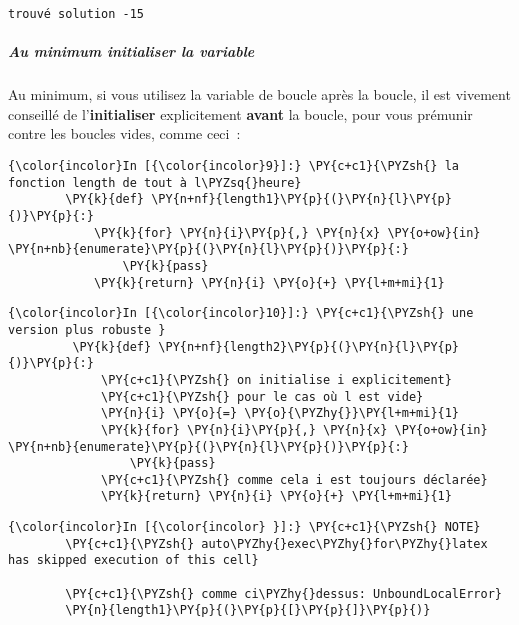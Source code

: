     \begin{Verbatim}[commandchars=\\\{\},frame=single,framerule=0.3mm,rulecolor=\color{cellframecolor}]
trouvé solution -15
\end{Verbatim}

    \hypertarget{au-minimum-initialiser-la-variable}{%
\subparagraph{Au minimum initialiser la
variable}\label{au-minimum-initialiser-la-variable}}

    Au minimum, si vous utilisez la variable de boucle après la boucle, il
est vivement conseillé de l'\textbf{initialiser} explicitement
\textbf{avant} la boucle, pour vous prémunir contre les boucles vides,
comme ceci~:

    \begin{Verbatim}[commandchars=\\\{\},frame=single,framerule=0.3mm,rulecolor=\color{cellframecolor}]
{\color{incolor}In [{\color{incolor}9}]:} \PY{c+c1}{\PYZsh{} la fonction length de tout à l\PYZsq{}heure}
        \PY{k}{def} \PY{n+nf}{length1}\PY{p}{(}\PY{n}{l}\PY{p}{)}\PY{p}{:}
            \PY{k}{for} \PY{n}{i}\PY{p}{,} \PY{n}{x} \PY{o+ow}{in} \PY{n+nb}{enumerate}\PY{p}{(}\PY{n}{l}\PY{p}{)}\PY{p}{:}
                \PY{k}{pass}
            \PY{k}{return} \PY{n}{i} \PY{o}{+} \PY{l+m+mi}{1}
\end{Verbatim}


    \begin{Verbatim}[commandchars=\\\{\},frame=single,framerule=0.3mm,rulecolor=\color{cellframecolor}]
{\color{incolor}In [{\color{incolor}10}]:} \PY{c+c1}{\PYZsh{} une version plus robuste }
         \PY{k}{def} \PY{n+nf}{length2}\PY{p}{(}\PY{n}{l}\PY{p}{)}\PY{p}{:}
             \PY{c+c1}{\PYZsh{} on initialise i explicitement}
             \PY{c+c1}{\PYZsh{} pour le cas où l est vide}
             \PY{n}{i} \PY{o}{=} \PY{o}{\PYZhy{}}\PY{l+m+mi}{1}
             \PY{k}{for} \PY{n}{i}\PY{p}{,} \PY{n}{x} \PY{o+ow}{in} \PY{n+nb}{enumerate}\PY{p}{(}\PY{n}{l}\PY{p}{)}\PY{p}{:}
                 \PY{k}{pass}
             \PY{c+c1}{\PYZsh{} comme cela i est toujours déclarée}
             \PY{k}{return} \PY{n}{i} \PY{o}{+} \PY{l+m+mi}{1}
\end{Verbatim}


    \begin{Verbatim}[commandchars=\\\{\},frame=single,framerule=0.3mm,rulecolor=\color{cellframecolor}]
{\color{incolor}In [{\color{incolor} }]:} \PY{c+c1}{\PYZsh{} NOTE}
        \PY{c+c1}{\PYZsh{} auto\PYZhy{}exec\PYZhy{}for\PYZhy{}latex has skipped execution of this cell}
        
        \PY{c+c1}{\PYZsh{} comme ci\PYZhy{}dessus: UnboundLocalError}
        \PY{n}{length1}\PY{p}{(}\PY{p}{[}\PY{p}{]}\PY{p}{)}
\end{Verbatim}


